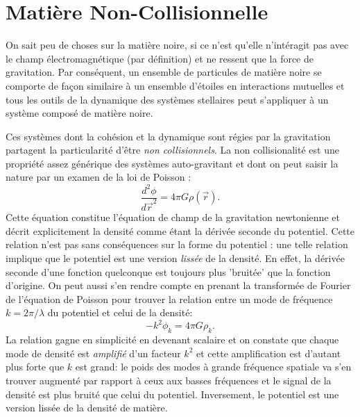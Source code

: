 \section{Matière Non-Collisionnelle}
On sait peu de choses sur la matière noire, si ce n'est qu'elle n'intéragit pas avec le champ électromagnétique (par définition) et ne ressent que la force de gravitation. Par conséquent, un ensemble de particules de matière noire se comporte de façon similaire à un ensemble d'étoiles en interactions mutuelles et tous les outils de la dynamique des systèmes stellaires peut s'appliquer à un système composé de matière noire.

Ces systèmes dont la cohésion et la dynamique sont régies par la gravitation partagent la particularité d'être \textit{non collisionnels}. La non collisionalité est une propriété assez générique des systèmes auto-gravitant  et dont on peut saisir la nature par un examen de la loi de Poisson  :
\begin{equation}
\frac{d^2\phi}{d\vec{r}^2}=4\pi G\rho(\vec{r}).
\end{equation} 
Cette équation constitue l'équation de champ de la gravitation newtonienne et décrit explicitement la densité comme étant la dérivée seconde du potentiel. Cette relation n'est pas sans conséquences sur la forme du potentiel : une telle relation implique que le potentiel est une version \textit{lissée} de la densité. En effet, la dérivée seconde d'une fonction quelconque est toujours plus 'bruitée' que la fonction d'origine. On peut aussi s'en rendre compte en prenant la transformée de Fourier de l'équation de Poisson pour trouver la relation entre un mode de fréquence $k=2\pi/\lambda$ du potentiel et celui de la densité:
\begin{equation}
-k^2 \phi_k=4\pi G \rho_k.
\end{equation}
La relation gagne en simplicité en devenant scalaire et on constate que chaque mode de densité est \textit{amplifié} d'un facteur $k^2$ et cette amplification est d'autant plus forte que $k$ est grand: le poids des modes à grande fréquence spatiale va s'en trouver augmenté par rapport à ceux aux basses fréquences et le signal de la densité est plus bruité que celui du potentiel. Inversement, le potentiel est une version lissée de la densité de matière.

